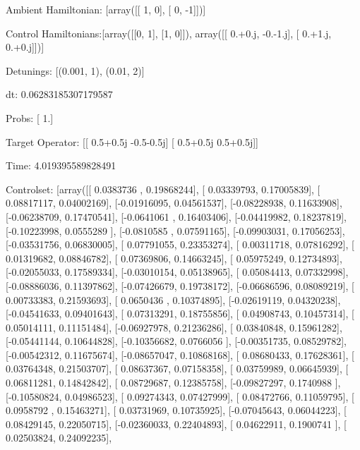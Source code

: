 \documentclass{article}
\begin{document}
    

\newpage

Ambient Hamiltonian: [array([[ 1,  0],
       [ 0, -1]])]

Control Hamiltonians:[array([[0, 1],
       [1, 0]]), array([[ 0.+0.j, -0.-1.j],
       [ 0.+1.j,  0.+0.j]])]

Detunings: [(0.001, 1), (0.01, 2)]

 dt: 0.06283185307179587

Probs: [ 1.]

Target Operator: [[ 0.5+0.5j -0.5-0.5j]
 [ 0.5+0.5j  0.5+0.5j]]

Time: 4.019395589828491

Controlset: [array([[ 0.0383736 ,  0.19868244],
       [ 0.03339793,  0.17005839],
       [ 0.08817117,  0.04002169],
       [-0.01916095,  0.04561537],
       [-0.08228938,  0.11633908],
       [-0.06238709,  0.17470541],
       [-0.0641061 ,  0.16403406],
       [-0.04419982,  0.18237819],
       [-0.10223998,  0.0555289 ],
       [-0.0810585 ,  0.07591165],
       [-0.09903031,  0.17056253],
       [-0.03531756,  0.06830005],
       [ 0.07791055,  0.23353274],
       [ 0.00311718,  0.07816292],
       [ 0.01319682,  0.08846782],
       [ 0.07369806,  0.14663245],
       [ 0.05975249,  0.12734893],
       [-0.02055033,  0.17589334],
       [-0.03010154,  0.05138965],
       [ 0.05084413,  0.07332998],
       [-0.08886036,  0.11397862],
       [-0.07426679,  0.19738172],
       [-0.06686596,  0.08089219],
       [ 0.00733383,  0.21593693],
       [ 0.0650436 ,  0.10374895],
       [-0.02619119,  0.04320238],
       [-0.04541633,  0.09401643],
       [ 0.07313291,  0.18755856],
       [ 0.04908743,  0.10457314],
       [ 0.05014111,  0.11151484],
       [-0.06927978,  0.21236286],
       [ 0.03840848,  0.15961282],
       [-0.05441144,  0.10644828],
       [-0.10356682,  0.0766056 ],
       [-0.00351735,  0.08529782],
       [-0.00542312,  0.11675674],
       [-0.08657047,  0.10868168],
       [ 0.08680433,  0.17628361],
       [ 0.03764348,  0.21503707],
       [ 0.08637367,  0.07158358],
       [ 0.03759989,  0.06645939],
       [ 0.06811281,  0.14842842],
       [ 0.08729687,  0.12385758],
       [-0.09827297,  0.1740988 ],
       [-0.10580824,  0.04986523],
       [ 0.09274343,  0.07427999],
       [ 0.08472766,  0.11059795],
       [ 0.0958792 ,  0.15463271],
       [ 0.03731969,  0.10735925],
       [-0.07045643,  0.06044223],
       [ 0.08429145,  0.22050715],
       [-0.02360033,  0.22404893],
       [ 0.04622911,  0.1900741 ],
       [ 0.02503824,  0.24092235],
\end{document}
